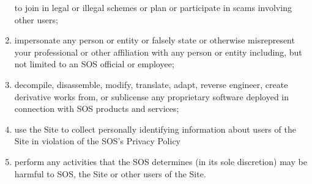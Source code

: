 \begin{enumerate}[label = \EnumerateLabel]
    to join in legal or illegal schemes or plan or participate in scams
    involving other users;
    \item impersonate any person or entity or falsely state or otherwise
    misrepresent your professional or other affiliation with any person or
    entity including, but not limited to an SOS official or employee;
    \item decompile, disassemble, modify, translate, adapt, reverse engineer,
    create derivative works from, or sublicense any proprietary software
    deployed in connection with SOS products and services;
    \item use the Site to collect personally identifying information about users
    of the Site in violation of the SOS's Privacy Policy
    \item perform any activities that the SOS determines (in its sole
    discretion) may be harmful to SOS, the Site or other users of the Site.
\end{enumerate}